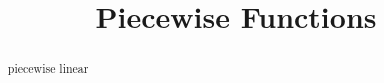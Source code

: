 \documentclass{ximera}
\title{Piecewise Functions}
\begin{document}
\begin{abstract}
piecewise linear
\end{abstract}
\maketitle
\end{document}
